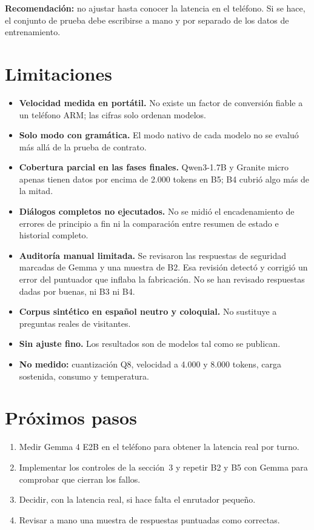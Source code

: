\documentclass[11pt,a4paper]{article}
\begin{document}
\textbf{Recomendación:} no ajustar hasta conocer la latencia en el teléfono. Si se hace, el conjunto de prueba debe escribirse a mano y por separado de los datos de entrenamiento.

\section{Limitaciones}

\begin{itemize}
\item \textbf{Velocidad medida en portátil.} No existe un factor de conversión fiable a un teléfono ARM; las cifras solo ordenan modelos.
\item \textbf{Solo modo con gramática.} El modo nativo de cada modelo no se evaluó más allá de la prueba de contrato.
\item \textbf{Cobertura parcial en las fases finales.} Qwen3-1.7B y Granite micro apenas tienen datos por encima de 2.000 tokens en B5; B4 cubrió algo más de la mitad.
\item \textbf{Diálogos completos no ejecutados.} No se midió el encadenamiento de errores de principio a fin ni la comparación entre resumen de estado e historial completo.
\item \textbf{Auditoría manual limitada.} Se revisaron las respuestas de seguridad marcadas de Gemma y una muestra de B2. Esa revisión detectó y corrigió un error del puntuador que inflaba la fabricación. No se han revisado respuestas dadas por buenas, ni B3 ni B4.
\item \textbf{Corpus sintético en español neutro y coloquial.} No sustituye a preguntas reales de visitantes.
\item \textbf{Sin ajuste fino.} Los resultados son de modelos tal como se publican.
\item \textbf{No medido:} cuantización Q8, velocidad a 4.000 y 8.000 tokens, carga sostenida, consumo y temperatura.
\end{itemize}

\section{Próximos pasos}

\begin{enumerate}
\item Medir Gemma 4 E2B en el teléfono para obtener la latencia real por turno.
\item Implementar los controles de la sección~3 y repetir B2 y B5 con Gemma para comprobar que cierran los fallos.
\item Decidir, con la latencia real, si hace falta el enrutador pequeño.
\item Revisar a mano una muestra de respuestas puntuadas como correctas.
\end{enumerate}
\end{document}
